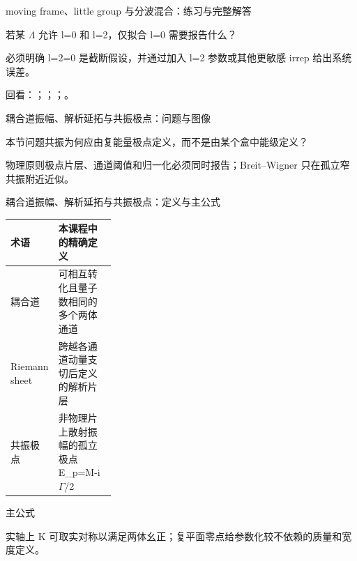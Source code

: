 \begin{frame}[t]{moving frame、little group 与分波混合：练习与完整解答}
\footnotesize
\begin{block}{}若某 \ensuremath{\Lambda} 允许 l=0 和 l=2，仅拟合 l=0 需要报告什么？\end{block}
\begin{exampleblock}{}必须明确 l=2=0 是截断假设，并通过加入 l=2 参数或其他更敏感 irrep 给出系统误差。\end{exampleblock}
\vfill
\scriptsize 回看：；；；。
\end{frame}

\begin{frame}[t]{耦合道振幅、解析延拓与共振极点：问题与图像}
\footnotesize
\begin{block}{本节问题}共振为何应由复能量极点定义，而不是由某个盒中能级定义？\end{block}
\begin{block}{物理原则}\quad 极点片层、通道阈值和归一化必须同时报告；Breit--Wigner 只在孤立窄共振附近近似。\end{block}
\end{frame}

\begin{frame}[t]{耦合道振幅、解析延拓与共振极点：定义与主公式}
\footnotesize\begin{tabularx}{\linewidth}{p{0.30\linewidth}Y}
\toprule 术语 & 本课程中的精确定义\\\midrule
{} 耦合道 & 可相互转化且量子数相同的多个两体通道\\
 Riemann sheet & 跨越各通道动量支切后定义的解析片层\\
 共振极点 & 非物理片上散射振幅的孤立极点 E\_p=M-i\ensuremath{\Gamma}/\allowbreak{}2\\
\bottomrule\end{tabularx}\vspace{0.15cm}
\begin{block}{ 主公式}\centering{}\end{block}
实轴上 K 可取实对称以满足两体幺正；复平面零点给参数化较不依赖的质量和宽度定义。
\end{frame}


